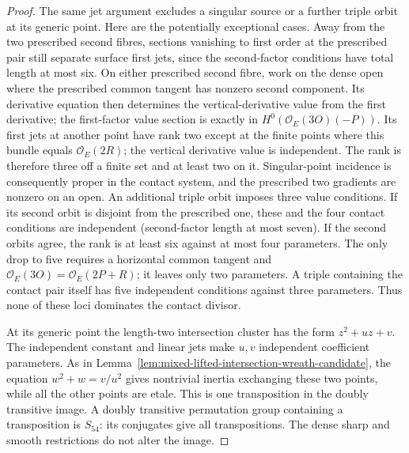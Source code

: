 \begin{proof}
The same jet argument excludes a singular source or a further
triple orbit at its generic point. Here are the potentially
exceptional cases. Away from the two prescribed second fibres,
sections vanishing to first order at the prescribed pair still
separate surface first jets, since the second-factor conditions
have total length at most six. On either prescribed second
fibre, work on the dense open where the prescribed common
tangent has nonzero second component. Its derivative equation
then determines the vertical-derivative value from the
first derivative; the first-factor value section is exactly in
$H^0(\mathcal O_E(3O)(-P))$. Its first jets at another point
have rank two except at the finite points where this bundle
equals $\mathcal O_E(2R)$; the vertical derivative value is
independent. The rank is therefore three off a finite set and
at least two on it. Singular-point incidence is consequently
proper in the contact system, and the prescribed two gradients
are nonzero on an open.
An additional triple orbit imposes three value conditions.
If its second orbit is disjoint from the prescribed one, these
and the four contact conditions are independent (second-factor
length at most seven). If the second orbits agree, the rank is
at least six against at most four parameters. The only drop
to five requires a horizontal common tangent and
$\mathcal O_E(3O)=\mathcal O_E(2P+R)$; it leaves only two
parameters. A triple containing the contact pair itself has
five independent conditions against three parameters.
Thus none of these loci dominates the contact divisor.

At its generic point the length-two intersection cluster has
the form $z^2+uz+v$. The independent constant and linear jets
make $u,v$ independent coefficient parameters. As in
Lemma~\ref{lem:mixed-lifted-intersection-wreath-candidate},
the equation $w^2+w=v/u^2$ gives nontrivial inertia exchanging
these two points, while all the other points are etale.
This is one transposition in the doubly transitive image.
A doubly transitive permutation group containing a
transposition is $S_{54}$: its conjugates give all transpositions.
The dense sharp and smooth restrictions do not alter the image.
\end{proof}

